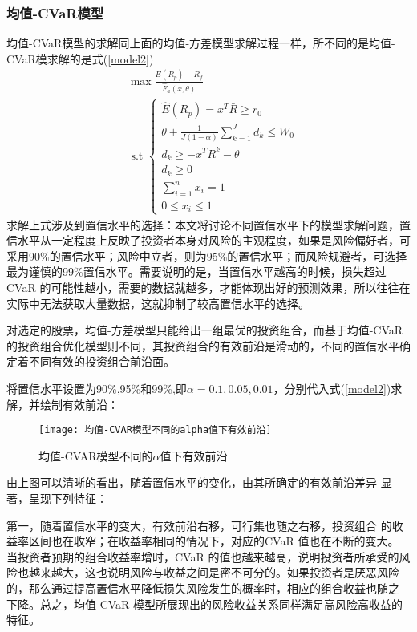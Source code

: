 \documentclass[withoutpreface,bwprint]{cumcmthesis} %
\begin{document}
	\subsubsection{均值-CVaR模型}
	均值-CVaR模型的求解同上面的均值-方差模型求解过程一样，所不同的是均值-CVaR模求解的是式(\ref{model2})
	\begin{equation}
	\begin{aligned}
	&\max \frac{E\left(R_{p}\right)-R_{f}}{\hat{F}_{a}(x, \theta)} \\
	&\text { s.t }\left\{\begin{array}{l}
	\hat{E}\left(R_{p}\right)=x^{T} \bar{R} \geq r_{0} \\
	\theta+\frac{1}{J(1-\alpha)} \sum_{k=1}^{J} d_{k} \leq W_{0} \\
	d_{k} \geq-x^{T} R^{k}-\theta \\
	d_{k} \geq 0 \\
	\sum_{i=1}^{n} x_{i}=1 \\
	0 \leq x_{i} \leq 1
	\end{array}\right.
	\end{aligned}
	\label{model2}
	\end{equation}
	求解上式涉及到置信水平的选择：本文将讨论不同置信水平下的模型求解问题，置信水平从一定程度上反映了投资者本身对风险的主观程度，如果是风险偏好者，可采用90\%的置信水平；风险中立者，则为95\%的置信水平；而风险规避者，可选择最为谨慎的99\%置信水平。需要说明的是，当置信水平越高的时候，损失超过 CVaR 的可能性越小，需要的数据就越多，才能体现出好的预测效果，所以往往在实际中无法获取大量数据，这就抑制了较高置信水平的选择。
	
	对选定的股票，均值-方差模型只能给出一组最优的投资组合，而基于均值-CVaR 的投资组合优化模型则不同，其投资组合的有效前沿是滑动的，不同的置信水平确定着不同有效的投资组合前沿面。
	
	将置信水平设置为90\%,95\%和99\%,即$\alpha=0.1,0.05,0.01$，分别代入式(\ref{model2})求解，并绘制有效前沿：
		\begin{figure}[H]
		\centering
		\texttt{[image: 均值-CVAR模型不同的alpha值下有效前沿]}
		\caption{均值-CVAR模型不同的$\alpha$值下有效前沿}
		\label{均值-CVAR模型不同的alpha值下有效前沿}
	\end{figure}
由上图可以清晰的看出，随着置信水平的变化，由其所确定的有效前沿差异
显著，呈现下列特征：

第一，随着置信水平的变大，有效前沿右移，可行集也随之右移，投资组合
的收益率区间也在收窄；在收益率相同的情况下，对应的CVaR 值也在不断的变大。
当投资者预期的组合收益率增时，CVaR 的值也越来越高，说明投资者所承受的风
险也越来越大，这也说明风险与收益之间是密不可分的。如果投资者是厌恶风险
的，那么通过提高置信水平降低损失风险发生的概率时，相应的组合收益也随之
下降。总之，均值-CVaR 模型所展现出的风险收益关系同样满足高风险高收益的
特征。
\end{document}
